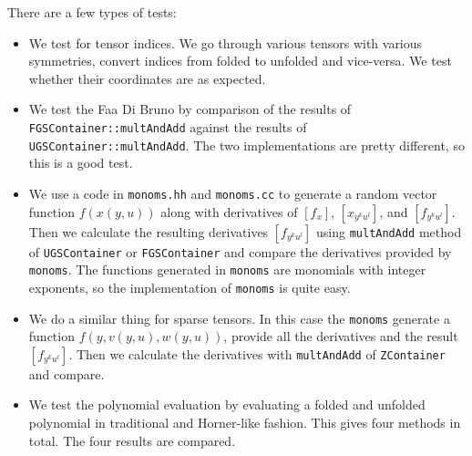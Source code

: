 \documentclass[11pt,a4paper]{article}
\begin{document}
There are a few types of tests:
\begin{itemize}
\item We test for tensor indices. We go through various tensors with
various symmetries, convert indices from folded to unfolded and
vice-versa. We test whether their coordinates are as expected.
\item We test the Faa Di Bruno by comparison of the results of
\texttt{FGSContainer::multAndAdd} against the results of \texttt{UGSContainer::multAndAdd}. The two
 implementations are pretty different, so this is a good test.
\item We use a code in {\tt monoms.hh} and {\tt monoms.cc} to generate a
 random vector function $f(x(y,u))$ along with derivatives of
 $\left[f_x\right]$, $\left[x_{y^ku^l}\right]$, and
 $\left[f_{y^ku^l}\right]$. Then we calculate the resulting derivatives
 $\left[f_{y^ku^l}\right]$ using \texttt{multAndAdd} method of \texttt{UGSContainer}
 or \texttt{FGSContainer} and compare the derivatives provided by {\tt
 monoms}. The functions generated in {\tt monoms} are monomials with
 integer exponents, so the implementation of {\tt monoms} is quite
 easy.
\item We do a similar thing for sparse tensors. In this case the {\tt monoms}
 generate a function $f(y,v(y,u),w(y,u))$, provide all the derivatives
 and the result $\left[f_{y^ku^l}\right]$. Then we calculate the
 derivatives with \texttt{multAndAdd} of \texttt{ZContainer} and compare.
\item We test the polynomial evaluation by evaluating a folded and
 unfolded polynomial in traditional and Horner-like fashion. This gives
 four methods in total. The four results are compared.
\end{itemize}
\end{document}
